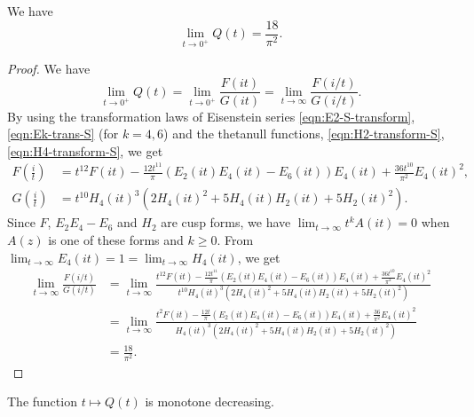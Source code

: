 \begin{lemma}\label{lemma:Qlim}
We have
\begin{equation}\label{eqn:Qlim}
  \lim_{t \to 0^+} Q(t) = \frac{18}{\pi^2}.
\end{equation}
\end{lemma}
\begin{proof}
We have
\begin{equation}
  \lim_{t \to 0^+} Q(t) = \lim_{t \to 0^+} \frac{F(it)}{G(it)} = \lim_{t \to \infty} \frac{F(i/t)}{G(i/t)}.
\end{equation}
By using the transformation laws of Eisenstein series \eqref{eqn:E2-S-transform}, \eqref{eqn:Ek-trans-S} (for $k = 4, 6$) and the thetanull functions, \eqref{eqn:H2-transform-S}, \eqref{eqn:H4-transform-S}, we get
\begin{align}
    F\left(\frac{i}{t}\right) &= t^{12} F(it) - \frac{12t^{11}}{\pi} (E_2(it)E_4(it) - E_6(it))E_4(it) + \frac{36t^{10}}{\pi^2}E_4(it)^2, \\
    G\left(\frac{i}{t}\right) &= t^{10} H_{4}(it)^{3}(2H_{4}(it)^{2} + 5 H_{4}(it)H_{2}(it) + 5 H_{2}(it)^{2}).
\end{align}
Since $F$, $E_2 E_4 - E_6$ and $H_2$ are cusp forms, we have $\lim_{t \to \infty}t^k A(it) = 0$ when $A(z)$ is one of these forms and $k \geq 0$.
From $\lim_{t \to \infty} E_4(it) = 1 = \lim_{t \to \infty}H_{4}(it)$, we get
\begin{align}
    \lim_{t \to \infty} \frac{F(i/t)}{G(i/t)}
    &= \lim_{t \to \infty} \frac{t^{12} F(it) - \frac{12t^{11}}{\pi} (E_2(it)E_4(it) - E_6(it))E_4(it) + \frac{36t^{10}}{\pi^2}E_4(it)^2}{t^{10} H_{4}(it)^{3}(2H_{4}(it)^{2} + 5 H_{4}(it)H_{2}(it) + 5 H_{2}(it)^{2})} \\
    &= \lim_{t \to \infty} \frac{t^{2} F(it) - \frac{12t}{\pi} (E_2(it)E_4(it) - E_6(it))E_4(it) + \frac{36}{\pi^2}E_4(it)^2}{H_{4}(it)^{3}(2H_{4}(it)^{2} + 5 H_{4}(it)H_{2}(it) + 5 H_{2}(it)^{2})} \\
    &= \frac{18}{\pi^2}.
\end{align}
\end{proof}

\begin{proposition}\label{prop:Qdec}
The function $t \mapsto Q(t)$ is monotone decreasing.
\end{proposition}

